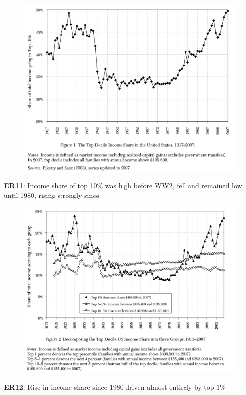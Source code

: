 \documentclass[11pt, aspectratio=169]{beamer}
\begin{document}
\begin{frame}{}
	\vspace{4mm}
	\begin{figure}
		\includegraphics[scale=0.28]{./figures/inequality_earnings_1}
	\end{figure}

	\vspace{0mm}
	{\color{blue}\textbf{ER11}}: Income share of top 10\% was high before WW2, fell and remained low until 1980, rising strongly since 
\end{frame}


\begin{frame}{}
	\vspace{4mm}
	\begin{figure}
		\includegraphics[scale=0.28]{./figures/inequality_earnings_2}
	\end{figure}

	\vspace{0mm}
	{\color{blue}\textbf{ER12}}: Rise in income share since 1980 driven almost entirely by top 1\%
\end{frame}
\end{document}
